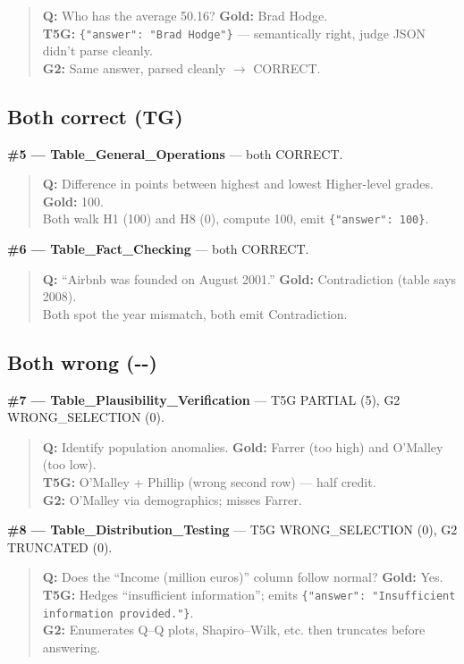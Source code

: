 \documentclass[11pt]{article}
\begin{document}
\begin{quote}
\textbf{Q:} Who has the average 50.16? \textbf{Gold:} Brad Hodge.\\
\textbf{T5G:} \texttt{\{"answer": "Brad Hodge"\}} --- semantically right, judge JSON didn't parse cleanly.\\
\textbf{G2:} Same answer, parsed cleanly $\to$ CORRECT.
\end{quote}

\subsection*{Both correct (TG)}

\textbf{\#5 --- Table\_General\_Operations} --- both CORRECT.

\begin{quote}
\textbf{Q:} Difference in points between highest and lowest Higher-level grades. \textbf{Gold:} 100.\\
Both walk H1 (100) and H8 (0), compute 100, emit \texttt{\{"answer": 100\}}.
\end{quote}

\textbf{\#6 --- Table\_Fact\_Checking} --- both CORRECT.

\begin{quote}
\textbf{Q:} ``Airbnb was founded on August 2001.'' \textbf{Gold:} Contradiction (table says 2008).\\
Both spot the year mismatch, both emit Contradiction.
\end{quote}

\subsection*{Both wrong (-{}-)}

\textbf{\#7 --- Table\_Plausibility\_Verification} --- T5G PARTIAL (5), G2 WRONG\_SELECTION (0).

\begin{quote}
\textbf{Q:} Identify population anomalies. \textbf{Gold:} Farrer (too high) and O'Malley (too low).\\
\textbf{T5G:} O'Malley + Phillip (wrong second row) --- half credit.\\
\textbf{G2:} O'Malley via demographics; misses Farrer.
\end{quote}

\textbf{\#8 --- Table\_Distribution\_Testing} --- T5G WRONG\_SELECTION (0), G2 TRUNCATED (0).

\begin{quote}
\textbf{Q:} Does the ``Income (million euros)'' column follow normal? \textbf{Gold:} Yes.\\
\textbf{T5G:} Hedges ``insufficient information''; emits \texttt{\{"answer": "Insufficient information provided."\}}.\\
\textbf{G2:} Enumerates Q--Q plots, Shapiro--Wilk, etc. then truncates before answering.
\end{quote}
\end{document}

